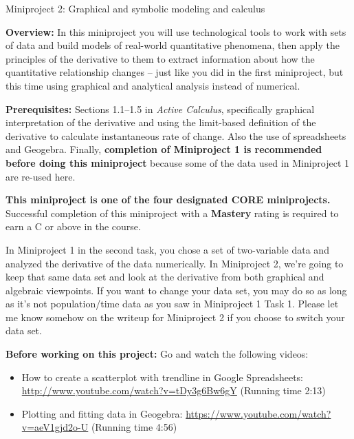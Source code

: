 \documentclass[11pt,letterpaper]{article}
\begin{document}
\begin{flushright}
	\begin{Large}
		Miniproject 2: Graphical and symbolic modeling and calculus
	\end{Large}
\end{flushright}

\noindent
\textbf{Overview:} In this miniproject you will use technological tools to work with sets of data and build models of real-world quantitative phenomena, then apply the principles of the derivative to them to extract information about how the quantitative relationship changes -- just like you did in the first miniproject, but this time using graphical and analytical analysis instead of numerical. 

\medskip

\noindent
\textbf{Prerequisites:} Sections 1.1--1.5 in \emph{Active Calculus}, specifically graphical interpretation of the derivative and using the limit-based definition of the derivative to calculate instantaneous rate of change. Also the use of spreadsheets and Geogebra. Finally, \textbf{completion of Miniproject 1 is recommended before doing this miniproject} because some of the data used in Miniproject 1 are re-used here. 

\medskip

\noindent
\textbf{This miniproject is one of the four designated CORE miniprojects.} Successful completion of this miniproject with a \textbf{Mastery} rating is required to earn a C or above in the course. 
	

\hrulefill

In Miniproject 1 in the second task, you chose a set of two-variable data and analyzed the derivative of the data numerically. In Miniproject 2, we're going to keep that same data set and look at the derivative from both graphical and algebraic viewpoints. If you want to change your data set, you may do so as long as it's not population/time data as you saw in Miniproject 1 Task 1. Please let me know somehow on the writeup for Miniproject 2 if you choose to switch your data set. 

\medskip

\noindent
\textbf{Before working on this project:} Go and watch the following videos: 
\begin{itemize}
	\item How to create a scatterplot with trendline in Google Spreadsheets: \url{http://www.youtube.com/watch?v=tDy3g6Bw6gY} (Running time 2:13) 
	\item Plotting and fitting data in Geogebra: \url{https://www.youtube.com/watch?v=aeV1gjd2o-U} (Running time 4:56) 
\end{itemize}
\end{document}
